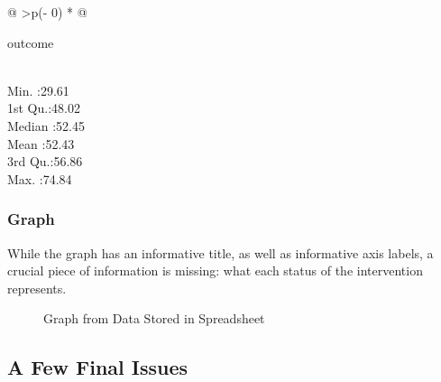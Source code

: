 \documentclass[
  letterpaper,
  DIV=11,
  numbers=noendperiod]{scrreprt}
\begin{document}
\begin{longtable}[]{@{}
  >{\centering\arraybackslash}p{(\columnwidth - 0\tabcolsep) * }@{}}
\toprule\noalign{}
\begin{minipage}[b]{\linewidth}\centering
outcome
\end{minipage} \\
\midrule\noalign{}
\endhead
\bottomrule\noalign{}
\endlastfoot
Min. :29.61 \\
1st Qu.:48.02 \\
Median :52.45 \\
Mean :52.43 \\
3rd Qu.:56.86 \\
Max. :74.84 \\
\end{longtable}

\subsubsection{Graph}\label{graph-1}

While the graph has an informative title, as well as informative axis
labels, a crucial piece of information is missing: what each status of
the intervention represents.

\begin{figure}


\caption{\label{fig-graph-spreadsheet}Graph from Data Stored in
Spreadsheet}

\end{figure}%

\subsection{A Few Final Issues}\label{a-few-final-issues}
\end{document}
